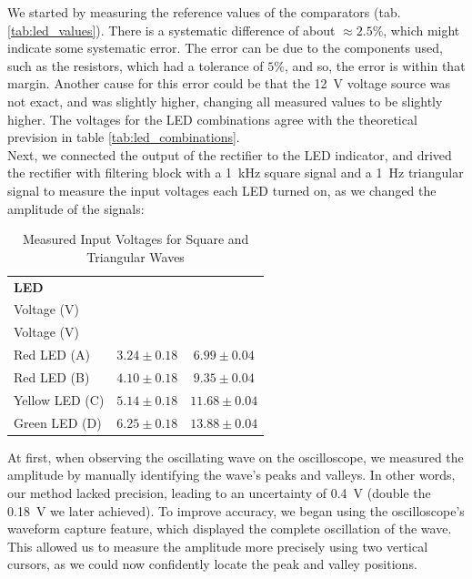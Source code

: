 \documentclass[lettersize,journal]{IEEEtran}
\begin{document}
We started by measuring the reference values of the comparators (tab. \ref{tab:led_values}). There is a systematic difference of about $\approx 2.5\%$, which might indicate some systematic error. The error can be due to the components used, such as the resistors, which had a tolerance of $5\%$, and so, the error is within that margin. Another cause for this error could be that the \SI{12}{\volt} voltage source was not exact, and was slightly higher, changing all measured values to be slightly higher. The voltages for the LED combinations agree with the theoretical prevision in table \ref{tab:led_combinations}.\\

Next, we connected the output of the rectifier to the LED indicator, and drived the rectifier with filtering block with a \SI{1}{\kilo \hertz} square signal and a \SI{1}{\hertz} triangular signal to measure the input voltages each LED turned on, as we changed the amplitude of the signals:\\

\begin{table}[h]
\centering
\caption{Measured Input Voltages for Square and Triangular Waves}
\label{tab:led_measured_voltages}
\begin{tabular}{lcc}
\toprule
\textbf{LED} & \textbf{\makecell{Square Wave (\SI{1}{\kilo \hertz}) \\Voltage (V)}} & \textbf{\makecell{Triangular Wave (\SI{1}{\hertz})\\Voltage (V)}} \\
\midrule
Red LED (A)    & $3.24 \pm 0.18$ & $6.99 \pm 0.04$ \\
Red LED (B)    & $4.10 \pm 0.18$ & $9.35 \pm 0.04$ \\
Yellow LED (C) & $5.14 \pm 0.18$ & $11.68 \pm 0.04$ \\ 
Green LED (D)  & $6.25 \pm 0.18$ & $13.88 \pm 0.04$ \\
\bottomrule
\end{tabular}
\end{table}

At first, when observing the oscillating wave on the oscilloscope, we measured the amplitude by manually identifying the wave's peaks and valleys. In other words, our method lacked precision, leading to an uncertainty of \SI{0.4}{\volt} (double the \SI{0.18}{\volt} we later achieved). To improve accuracy, we began using the oscilloscope’s waveform capture feature, which displayed the complete oscillation of the wave. This allowed us to measure the amplitude more precisely using two vertical cursors, as we could now confidently locate the peak and valley positions.\\
\end{document}
